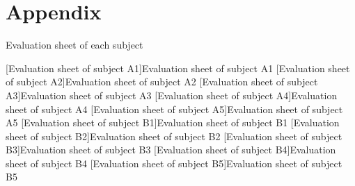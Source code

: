 \chapter*{Appendix}

\setcounter{figure}{0}    
\renewcommand{\thefigure}{A. \arabic{figure} }
\par Evaluation sheet of each subject 

[Evaluation sheet of subject A1]{Evaluation sheet of subject A1}
[Evaluation sheet of subject A2]{Evaluation sheet of subject A2}
[Evaluation sheet of subject A3]{Evaluation sheet of subject A3}
[Evaluation sheet of subject A4]{Evaluation sheet of subject A4}
[Evaluation sheet of subject A5]{Evaluation sheet of subject A5}
[Evaluation sheet of subject B1]{Evaluation sheet of subject B1}
[Evaluation sheet of subject B2]{Evaluation sheet of subject B2}
[Evaluation sheet of subject B3]{Evaluation sheet of subject B3}
[Evaluation sheet of subject B4]{Evaluation sheet of subject B4}
[Evaluation sheet of subject B5]{Evaluation sheet of subject B5}
